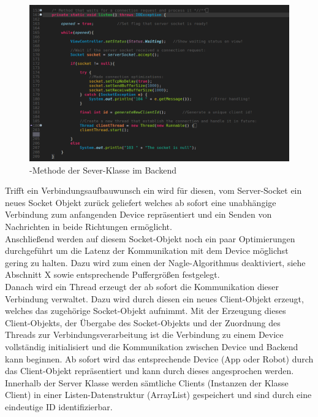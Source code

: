 \begin{figure}[ht]
	\centering
	\includegraphics[width=1.0\textwidth]{images/implementation/SeverListenMethod.png}
	\caption[-Methode der Sever-Klasse im Backend]{-Methode der Sever-Klasse im Backend}
	\label{fig:ev3system}
\end{figure}
Trifft ein Verbindungsaufbauwunsch ein wird für diesen, vom Server-Socket ein neues Socket Objekt zurück geliefert welches 
ab sofort eine unabhängige Verbindung zum anfangenden Device repräsentiert und ein Senden von Nachrichten in beide Richtungen 
ermöglicht.\\
Anschließend werden auf diesem Socket-Objekt noch ein paar Optimierungen durchgeführt um die Latenz der Kommunikation mit dem
Device möglichst gering zu halten. Dazu wird zum einen der Nagle-Algorithmus deaktiviert, siehe Abschnitt X sowie entsprechende
Puffergrößen festgelegt. \\
Danach wird ein Thread erzeugt der ab sofort die Kommunikation dieser Verbindung verwaltet. Dazu wird durch diesen ein neues Client-Objekt 
erzeugt, welches das zugehörige Socket-Objekt aufnimmt. Mit der Erzeugung dieses Client-Objekts, der Übergabe des Socket-Objekts und
der Zuordnung des Threads zur Verbindungsverarbeitung ist die Verbindung zu einem Device vollständig initialisiert und die Kommunikation 
zwischen Device und Backend kann beginnen. 
Ab sofort wird das entsprechende Device (App oder Robot) durch das Client-Objekt repräsentiert und kann durch dieses angesprochen werden. 
Innerhalb der Server Klasse werden sämtliche Clients (Instanzen der Klasse Client) in einer Listen-Datenstruktur (ArrayList) gespeichert 
und sind durch eine eindeutige ID identifizierbar.
